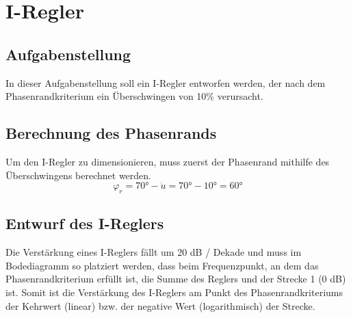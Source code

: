 \documentclass[twoside]{article}
\begin{document}
\newpage
\section{I-Regler}
\subsection{Aufgabenstellung}
In dieser Aufgabenstellung soll ein I-Regler entworfen werden, der nach dem Phasenrandkriterium ein Überschwingen von 10\% verursacht.

\subsection{Berechnung des Phasenrands}
Um den I-Regler zu dimensionieren, muss zuerst der Phasenrand mithilfe des Überschwingens berechnet werden.
\begin{equation}
\varphi_{r} = 70° - \ddot u = 70° - 10° = 60°
\end{equation}

\subsection{Entwurf des I-Reglers}
Die Verstärkung eines I-Reglers fällt um 20 dB / Dekade und muss im Bodediagramm so platziert werden, dass beim Frequenzpunkt, an dem das Phasenrandkriterium erfüllt ist, die Summe des Reglers und der Strecke 1 (0 dB) ist. Somit ist die Verstärkung des I-Reglers am Punkt des Phasenrandkriteriums der Kehrwert (linear) bzw. der negative Wert (logarithmisch) der Strecke.
\end{document}
